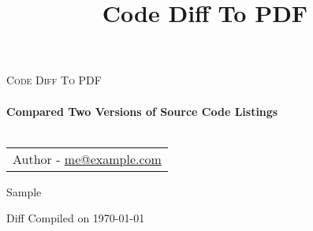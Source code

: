 \documentclass[10pt, oneside]{article}
\title{Code Diff To PDF}
\begin{document}
\sloppy

\begin{titlepage}

\center 
\textsc{\LARGE Code Diff To PDF}\\[1.5cm] 

\HRule \\[0.4cm]
{ \huge \bfseries Compared Two Versions of Source Code Listings 
}\\[0.4cm] 
\HRule \\[1.5cm]


\begin{center}
\begin{tabular}{ c} 
Author - \href{mailto:me@example.com}{me@example.com}
\end{tabular}
\end{center}

\vfill
Sample

Diff Compiled on \today
\vfill 

\end{titlepage}


\tableofcontents

\lstlistoflistings

\newpage





\newpage




\appendix

\newpage



% 

\end{document}
